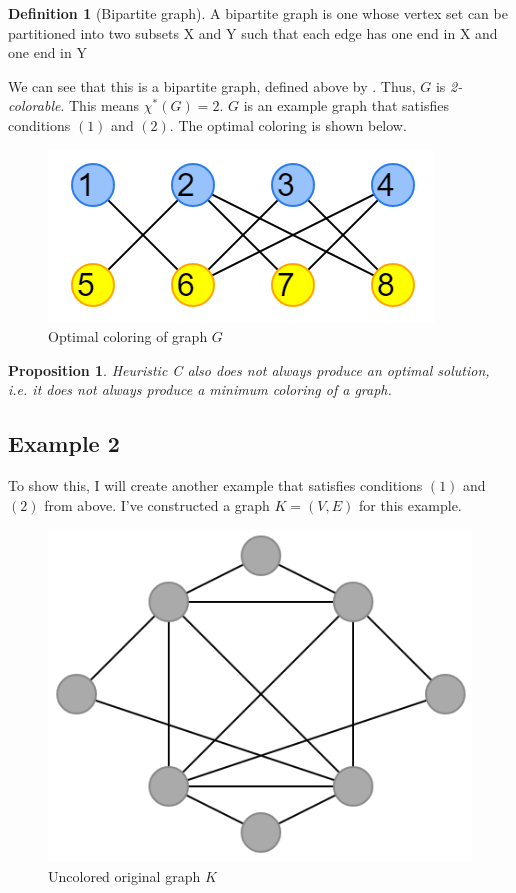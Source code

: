 \documentclass{article}
\newtheorem{prop}{Proposition}
\theoremstyle{definition}
\newtheorem*{definition}{Definition}
\begin{document}
\begin{definition}[Bipartite graph]
A bipartite graph is one whose vertex set can be partitioned into two subsets X and Y such that each edge has one end in X and one end in Y
\end{definition}

We can see that this is a bipartite graph, defined above by \cite{bondymurty}. Thus, \(G\) is \emph{2-colorable}. This means \(\chi^{*}(G) = 2\). \(G\) is an example graph that satisfies conditions \((1)\) and \((2)\). The optimal coloring is shown below.

\begin{figure}[H]
\centering
\includegraphics[scale=0.6]{images/graph-3.png}
\caption{Optimal coloring of graph \(G\)}
\end{figure}

\begin{prop}
Heuristic C also does not always produce an optimal solution, i.e. it does not always produce a minimum coloring of a graph.
\end{prop}

\subsection*{Example 2}
To show this, I will create another example that satisfies conditions \((1)\) and \((2)\) from above. I've constructed a graph \(K = (V,E)\) for this example.

\begin{figure}[H]
\centering
\includegraphics[scale=0.38]{images/mis-1.png}
\caption{Uncolored original graph \(K\)}
\end{figure}
\end{document}
